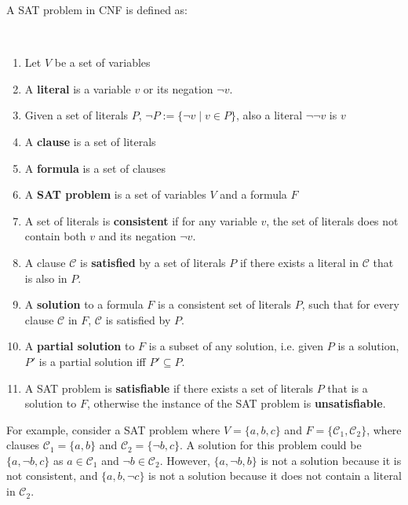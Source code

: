 A SAT problem in CNF is defined as:
\begin{defs}
\label{impl.defSAT}
{\ }
\begin{enumerate}
    \item Let $V$ be a set of variables
    \item A \textbf{literal} is a variable $v$ or its negation $\neg v$.
    \item Given a set of literals $P$, $\neg P := \{\neg v \mid v \in P\}$, also a literal $\neg \neg v$ is $v$
    \item A \textbf{clause} is a set of literals 
    \item A \textbf{formula} is a set of clauses \label{impl.whatisaformula}
    \item A \textbf{SAT problem} is a set of variables $V$ and a formula $F$
    \item A set of literals is \textbf{consistent} if for any variable $v$, the set of literals does not contain both $v$ and its negation $\neg v$.
    \item A clause $\mathcal{C}$ is \textbf{satisfied} by a set of literals $P$ if there exists a literal in $\mathcal{C}$ that is also in $P$.
    \item A \textbf{solution} to a formula $F$ is a consistent set of literals $P$, such that for every clause $\mathcal{C}$ in $F$, $\mathcal{C}$ is satisfied by $P$.
    \item A \textbf{partial solution} to $F$ is a subset of any solution, i.e. given $P$ is a solution, $P'$ is a partial solution iff $P' \subseteq P$.
    \item A SAT problem is \textbf{satisfiable} if there exists a set of literals $P$ that is a solution to $F$, otherwise the instance of the SAT problem is \textbf{unsatisfiable}. 
\end{enumerate}
\end{defs}

For example, consider a SAT problem where $V = \{a,b,c\}$ and $F = \{\mathcal{C}_1,\mathcal{C}_2\}$, where clauses $\mathcal{C}_1 = \{a,b\}$ and $\mathcal{C}_2 = \{\neg b, c\}$.
A solution for this problem could be $\{a,\neg b,c\}$ as $a \in \mathcal{C}_1$ and $\neg b \in \mathcal{C}_2$.
However, $\{a, \neg b, b\}$ is not a solution because it is not consistent, and $\{a, b, \neg c\}$ is not a solution because it does not contain a literal in $\mathcal{C}_2$.  



